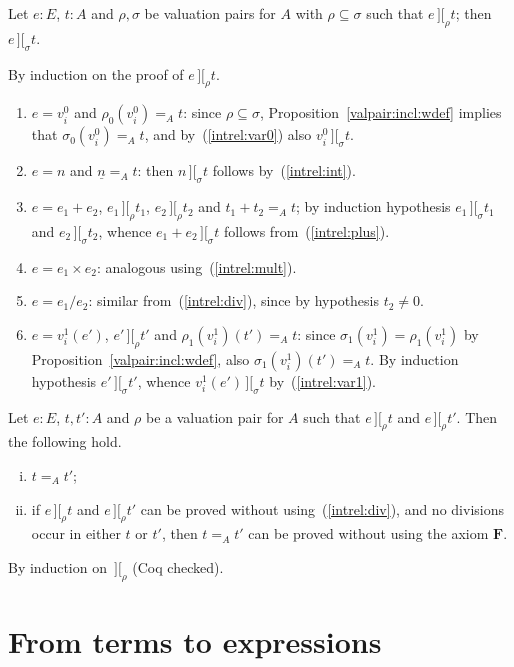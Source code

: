 \documentclass[numreferences]{kluwer}
\newcommand{\intII}{\,]\![}
\newcommand{\intrel}{\mathbin{\intII_{\rho}}}
\newcommand{\axiom}[1]{\ensuremath{\mathbf{#1}}}
\newcommand{\intrels}{\mathbin{\intII_{\sigma}}}
\begin{document}
\begin{article}
\begin{lemma}\label{inclinterp}
Let $e:E$, $t:A$ and $\rho,\sigma$ be valuation pairs for $A$ with
$\rho\subseteq\sigma$ such that $e\intrel t$; then $e\intrels t$.
\end{lemma}
\begin{pf} By induction on the proof of $e\intrel t$.
\begin{enumerate}
\item $e=v^0_i$ and $\rho_0(v^0_i)=_A t$: since $\rho\subseteq\sigma$,
Proposition~\ref{valpair:incl:wdef} implies that $\sigma_0(v^0_i)=_A t$,
and by~(\ref{intrel:var0}) also $v^0_i\intrels t$.
\item $e=n$ and $\underline n=_A t$: then $n\intrels t$ follows
by~(\ref{intrel:int}).
\item $e=e_1+e_2$, $e_1\intrel t_1$, $e_2\intrel t_2$ and $t_1+t_2=_A t$;
by induction hypothesis $e_1\intrels t_1$ and $e_2\intrels t_2$, whence
$e_1+e_2\intrels t$ follows from~(\ref{intrel:plus}).
\item $e=e_1\times e_2$: analogous using~(\ref{intrel:mult}).
\item $e=e_1/e_2$: similar from~(\ref{intrel:div}),
since by hypothesis $t_2\neq 0$.
\item $e=v^1_i(e')$, $e'\intrel t'$ and $\rho_1(v^1_i)(t')=_A t$: since
$\sigma_1(v^1_i)=\rho_1(v^1_i)$ by Proposition~\ref{valpair:incl:wdef},
also $\sigma_1(v^1_i)(t')=_A t$.  By induction hypothesis $e'\intrels t'$,
whence $v^1_i(e')\intrels t$ by~(\ref{intrel:var1}).
\end{enumerate}
\end{pf}

\begin{lemma}\label{intrelfunction} Let $e:E$, $t,t':A$ and $\rho$ be
a valuation pair for $A$ such that $e\intrel t$ and $e\intrel t'$.
Then the following hold.
\begin{enumerate}[(i)]
\item $t=_A t'$;
\item if $e\intrel t$ and $e\intrel t'$ can be proved without
using~(\ref{intrel:div}), and no divisions occur in either $t$ or $t'$,
then $t=_A t'$ can be proved without using the axiom \axiom{F}.
\end{enumerate}
\end{lemma}
\begin{pf} By induction on $\intrel$ (Coq checked).
\end{pf}

\section{From terms to expressions}\label{quoteing}


\end{article}
\end{document}
